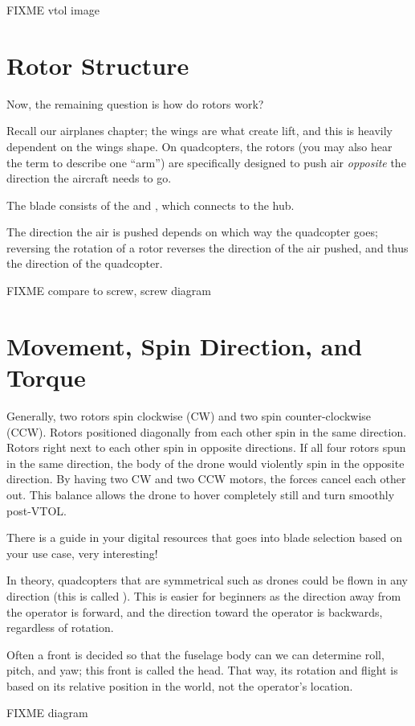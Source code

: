 FIXME vtol image

\section{Rotor Structure}
Now, the remaining question is how do rotors work? 

Recall our airplanes chapter; the wings are what create lift, and this is heavily dependent on the wings shape. On quadcopters, the rotors (you may also hear the term  to describe one ``arm'') are specifically designed to push air \emph{opposite} the direction the aircraft needs to go.

The blade consists of the  and , which connects to the hub. 

The direction the air is pushed depends on which way the quadcopter goes; reversing the rotation of a rotor reverses the direction of the air pushed, and thus the direction of the quadcopter.

FIXME compare to screw, screw diagram
\section{Movement, Spin Direction, and Torque}
Generally, two rotors spin clockwise (CW) and two spin counter-clockwise (CCW). Rotors positioned diagonally from each other spin in the same direction. Rotors right next to each other spin in opposite directions. If all four rotors spun in the same direction, the body of the drone would violently spin in the opposite direction. By having two CW and two CCW motors, the forces cancel each other out. This balance allows the drone to hover completely still and turn smoothly post-VTOL. 

There is a guide in your digital resources that goes into blade selection based on your use case, very interesting!

In theory, quadcopters that are symmetrical such as drones could be flown in any direction (this is called ). This is easier for beginners as the direction away from the operator is forward, and the direction toward the operator is backwards, regardless of rotation. 

Often a front is decided so that the fuselage body can we can determine roll, pitch, and yaw; this front is called the head. That way, its rotation and flight is based on its relative position in the world, not the operator's location.

FIXME diagram


